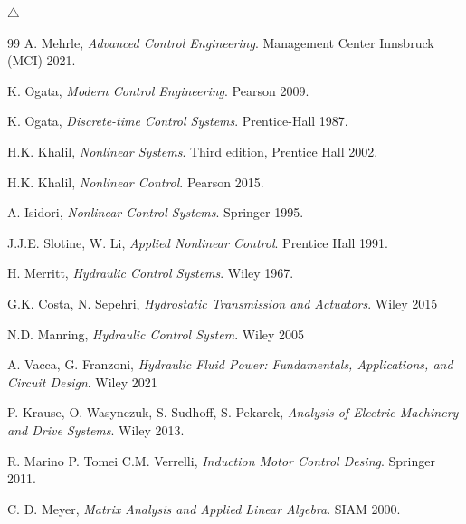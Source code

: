 \documentclass[12pt,a4paper,oneside]{book}
\begin{document}
\begin{onehalfspace}
\begin{example}
	\hfill$\triangle$
\end{example}

\begin{thebibliography}{99}
	A. Mehrle, \emph{Advanced Control Engineering}. Management Center Innsbruck (MCI) 2021.
	
	K. Ogata, \emph{Modern Control Engineering}. Pearson 2009.	
	
	K. Ogata, \emph{Discrete-time Control Systems}. Prentice-Hall 1987.
	
	H.K. Khalil, \emph{Nonlinear Systems}. Third edition, Prentice Hall 
	2002.
	
	H.K. Khalil, \emph{Nonlinear Control}. Pearson 2015.
	
	A. Isidori, \emph{Nonlinear Control Systems}. Springer 1995.
	
	J.J.E. Slotine, W. Li, \emph{Applied Nonlinear Control}. Prentice Hall 
	1991.
	
	H. Merritt, \emph{Hydraulic Control Systems}. Wiley 1967.
	
	G.K. Costa, N. Sepehri, \emph{Hydrostatic Transmission and Actuators}. 
	Wiley 2015
	
	N.D. Manring, \emph{Hydraulic Control System}. Wiley 2005
	
	A. Vacca, G. Franzoni, \emph{Hydraulic Fluid Power: Fundamentals, 
		Applications, and Circuit Design}. Wiley 2021
	
	P. Krause, O. Wasynczuk, S. Sudhoff, S. Pekarek, \emph{Analysis of Electric Machinery and Drive Systems}. Wiley 2013.
	
	R. Marino P. Tomei C.M. Verrelli, \emph{Induction Motor Control Desing}. Springer 2011.
	
	C. D. Meyer, \emph{Matrix Analysis and Applied Linear Algebra}. SIAM 2000.
\end{thebibliography}
\end{onehalfspace}
\end{document}
